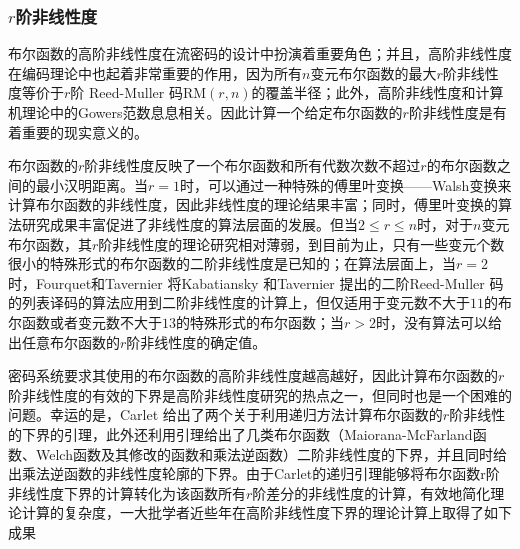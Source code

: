 \documentclass[a4paper,zihao=-4,AutoFakeBold]{ctexart}
\begin{document}
\subsubsection{$r$阶非线性度}
布尔函数的高阶非线性度在流密码的设计中扮演着重要角色；并且，高阶非线性度在编码理论中也起着非常重要的作用，因为所有$n$变元布尔函数的最大$r$阶非线性度等价于$r$阶 Reed-Muller 码$\mathrm{RM}(r, n)$的覆盖半径；此外，高阶非线性度和计算机理论中的Gowers范数息息相关。因此计算一个给定布尔函数的$r$阶非线性度是有着重要的现实意义的。

布尔函数的$r$阶非线性度反映了一个布尔函数和所有代数次数不超过$ r $的布尔函数之间的最小汉明距离。当$r=1$时，可以通过一种特殊的傅里叶变换——Walsh变换来计算布尔函数的非线性度，因此非线性度的理论结果丰富；同时，傅里叶变换的算法研究成果丰富促进了非线性度的算法层面的发展。但当$2\le r \le n$时，对于$n$变元布尔函数，其$r$阶非线性度的理论研究相对薄弱，到目前为止，只有一些变元个数很小的特殊形式的布尔函数的二阶非线性度是已知的；在算法层面上，当$r=2$时，Fourquet和Tavernier 将Kabatiansky 和Tavernier 提出的二阶Reed-Muller 码的列表译码的算法应用到二阶非线性度的计算上，但仅适用于变元数不大于$11$的布尔函数或者变元数不大于$13$的特殊形式的布尔函数；当$r>2$时，没有算法可以给出任意布尔函数的$r$阶非线性度的确定值。

密码系统要求其使用的布尔函数的高阶非线性度越高越好，因此计算布尔函数的$r$阶非线性度的有效的下界是高阶非线性度研究的热点之一，但同时也是一个困难的问题。幸运的是，Carlet 给出了两个关于利用递归方法计算布尔函数的$r$阶非线性的下界的引理，此外还利用引理给出了几类布尔函数（Maiorana-McFarland函数、Welch函数及其修改的函数和乘法逆函数）二阶非线性度的下界，并且同时给出乘法逆函数的非线性度轮廓的下界。由于Carlet的递归引理能够将布尔函数r阶非线性度下界的计算转化为该函数所有$r$阶差分的非线性度的计算，有效地简化理论计算的复杂度，一大批学者近些年在高阶非线性度下界的理论计算上取得了如下成果
\end{document}
